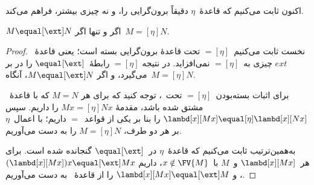 \documentclass[../../../include/open-logic-section]{subfiles}
\begin{document}
اکنون ثابت می‌کنیم که قاعدهٔ~$\eta$ دقیقاً برون‌گرایی را، و نه چیزی
بیشتر، فراهم می‌کند.

\begin{thm}
  $M \equal[\ext] N$ اگر و تنها اگر~$M \equal[\eta] N$.
\end{thm}

\begin{proof}
  نخست ثابت می‌کنیم~$\equal[\eta]$ تحت قاعدهٔ برون‌گرایی بسته است؛ یعنی
  قاعدهٔ~$ext$ چیزی به~$\equal[\eta]$ نمی‌افزاید. در نتیجه
  $\equal[\eta]$ رابطهٔ~$\equal[\ext]$ را در بر می‌گیرد، و اگر
  $M \equal[\ext] N$، آنگاه~$M \equal[\eta] N$.

  برای اثبات بسته‌بودن~$\equal[\eta]$ تحت~\ext، توجه کنید که برای هر
  $M \equal N$ که با قاعدهٔ~\ext{} مشتق شده باشد، مقدمهٔ
  $Mx \equal[\eta] Nx$ را داریم. سپس
  $\lambd[x][Mx] \equal[\eta] \lambd[x][Nx]$ را بنا بر یکی از
  قواعد~$\equal$ داریم؛ با اعمال~$\eta$ بر هر دو طرف،
  $M \equal[\eta] N$ را به دست می‌آوریم.

  به‌همین‌ترتیب ثابت می‌کنیم که قاعدهٔ~$\eta$ در~$\equal[\ext]$ گنجانده
  شده است. برای هر~$\lambd[x][Mx]$ و~$M$ با~$x \notin \FV{M}$، داریم
  $(\lambd[x][Mx])x \equal[\ext] Mx$، و
  $\lambd[x][Mx] \equal[\ext] M$ را از قاعدهٔ~\ext{} به دست می‌آوریم.
\end{proof}
\end{document}
